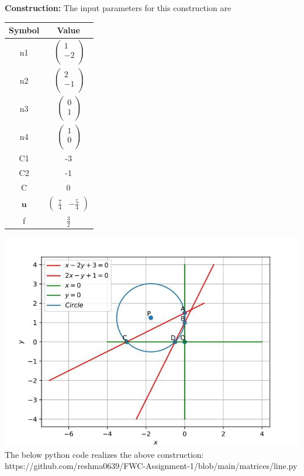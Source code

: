 \documentclass[8pt,a4paper]{report}
\newcommand{\myvec}[1]{\ensuremath{\begin{pmatrix}#1\end{pmatrix}}}
\let\vec\mathbf
\begin{document}
\begin{multicols}{2}
\raggedright\Large \textbf{Construction:} \vspace{2mm}
The input parameters for this construction are 
\begin{center}
\begin{tabular}{|c|c|}
	\hline
	\textbf{Symbol}&\textbf{Value}\\
	\hline
	n1&$\
	\begin{pmatrix}
		1 \\
		-2\\
	\end{pmatrix}$%
	\\
	\hline
	n2&$\
	\begin{pmatrix}
		2\\
		-1 \\
	\end{pmatrix}$%
	\\
	\hline
	n3&$\
	\begin{pmatrix}
		0\\
		1\\
	\end{pmatrix}$%
	\\
	\hline
	n4&$\
	\begin{pmatrix}
		1\\
		0\\
	\end{pmatrix}$%
	\\
	\hline
	C1& -3
	\\
	\hline
	C2&-1\\
	\hline
	C&0\\
	\hline
	$\vec{u}$&$\myvec{\frac{7}{4}&-\frac{5}{4}}$%
	\\
	\hline
	f&$\frac{3}{2}$%
	\\\hline
\end{tabular}
\end{center}
\includegraphics[scale=0.4]{circ.jpg}
The below python code realizes the above construction:	
\centering     https://github.com/reshma0639/FWC-Assignment-1/blob/main/matrices/line.py
\end{multicols}
\end{document}
